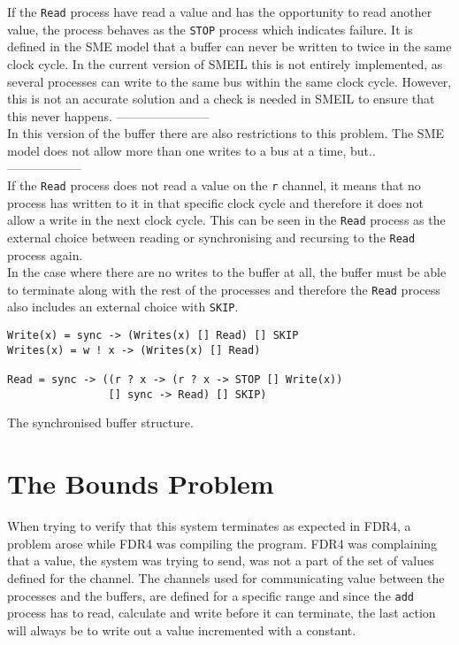 If the \texttt{Read} process have read a value and has the opportunity to read another value, the process behaves as the \texttt{STOP} process which indicates failure. It is defined in the SME model that a buffer can never be written to twice in the same clock cycle. In the current version of SMEIL this is not entirely implemented, as several processes can write to the same bus within the same clock cycle. However, this is not an accurate solution and a check is needed in SMEIL to ensure that this never happens.
-----------------------\\
In this version of the buffer there are also restrictions to this problem. The SME model does not allow more than one writes to a bus at a time, but..\\
------------------\\
If the \texttt{Read} process does not read a value on the \texttt{r} channel, it means that no process has written to it in that specific clock cycle and therefore it does not allow a write in the next clock cycle. This can be seen in the \texttt{Read} process as the external choice between reading or synchronising and recursing to the \texttt{Read} process again.\\

In the case where there are no writes to the buffer at all, the buffer must be able to terminate along with the rest of the processes and therefore the \texttt{Read} process also includes an external choice with \texttt{SKIP}.


\begin{listing}
\begin{verbatim}
Write(x) = sync -> (Writes(x) [] Read) [] SKIP
Writes(x) = w ! x -> (Writes(x) [] Read)

Read = sync -> ((r ? x -> (r ? x -> STOP [] Write(x))
                [] sync -> Read) [] SKIP)
\end{verbatim}
\caption{The synchronised buffer structure.}
\label{lst:buffer}
\end{listing}

\section{The Bounds Problem}
When trying to verify that this system terminates as expected in FDR4, a problem arose while FDR4 was compiling the program. FDR4 was complaining that a value, the system was trying to send, was not a part of the set of values defined for the channel.
The channels used for communicating value between the processes and the buffers, are defined for a specific range and since the \texttt{add} process has to read, calculate and write before it can terminate, the last action will always be to write out a value incremented with a constant.\\

